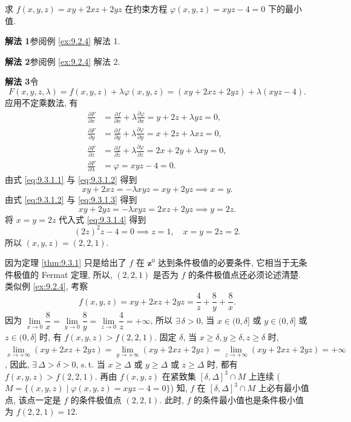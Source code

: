 \begin{example}\label{ex:9.3.1}
求 $f(x, y, z) = xy + 2xz + 2yz$ 在约束方程 $\varphi(x, y, z) = xyz - 4 = 0$ 下的最小值.
\end{example}

\begin{solution}
\textbf{解法 1}\quad 参阅例 \ref{ex:9.2.4} 解法 1.

\textbf{解法 2}\quad 参阅例 \ref{ex:9.2.4} 解法 2.

\textbf{解法 3}\quad 令
\[
  F(x, y, z, \lambda) = f(x, y, z) + \lambda \varphi(x, y, z) = (xy + 2xz + 2yz) + \lambda(xyz - 4).
\]
应用不定乘数法, 有
\begin{align}
  \frac{\partial F}{\partial x} &= \frac{\partial f}{\partial x} + \lambda \frac{\partial \varphi}{\partial x} = y + 2z + \lambda yz = 0, \label{eq:9.3.1.1} \\
  \frac{\partial F}{\partial y} &= \frac{\partial f}{\partial y} + \lambda \frac{\partial \varphi}{\partial y} = x + 2z + \lambda xz = 0, \label{eq:9.3.1.2} \\
  \frac{\partial F}{\partial z} &= \frac{\partial f}{\partial z} + \lambda \frac{\partial \varphi}{\partial z} = 2x + 2y + \lambda xy = 0, \label{eq:9.3.1.3} \\
  \frac{\partial F}{\partial \lambda} &= \varphi = xyz - 4 = 0. \label{eq:9.3.1.4}
\end{align}
由式 \eqref{eq:9.3.1.1} 与 \eqref{eq:9.3.1.2} 得到
\[
  xy + 2xz = -\lambda xyz = xy + 2yz \implies x = y.
\]
由式 \eqref{eq:9.3.1.2} 与 \eqref{eq:9.3.1.3} 得到
\[
  xy + 2yz = -\lambda xyz = 2xz + 2yz \implies y = 2z.
\]
将 $x = y = 2z$ 代入式 \eqref{eq:9.3.1.4} 得到
\[
  (2z)^{2}z - 4 = 0 \implies z = 1, \quad x = y = 2z = 2.
\]
所以 $(x, y, z) = (2, 2, 1)$.

因为定理 \ref{thm:9.3.1} 只是给出了 $f$ 在 $\boldsymbol{z}^{0}$ 达到条件极值的必要条件, 它相当于无条件极值的 Fermat 定理, 所以, $(2, 2, 1)$ 是否为 $f$ 的条件极值点还必须论述清楚. 类似例 \ref{ex:9.2.4}, 考察
\[
  f(x, y, z) = xy + 2xz + 2yz = \frac{4}{z} + \frac{8}{y} + \frac{8}{x}.
\]
因为 $\lim\limits_{x \to 0} \dfrac{8}{x} = \lim\limits_{y \to 0} \dfrac{8}{y} = \lim\limits_{z \to 0} \dfrac{4}{z} = +\infty$, 所以 $\exists\, \delta > 0$, 当 $x \in (0, \delta]$ 或 $y \in (0, \delta]$ 或 $z \in (0, \delta]$ 时, 有 $f(x, y, z) > f(2, 2, 1)$. 固定 $\delta$, 当 $x \geqslant \delta, y \geqslant \delta, z \geqslant \delta$ 时, $\lim\limits_{x \to +\infty}(xy + 2xz + 2yz) = \lim\limits_{y \to +\infty}(xy + 2xz + 2yz) = \lim\limits_{z \to +\infty}(xy + 2xz + 2yz) = +\infty$, 因此, $\exists\, \Delta > \delta > 0$, s.\,t. 当 $x \geqslant \Delta$ 或 $y \geqslant \Delta$ 或 $z \geqslant \Delta$ 时, 都有 $f(x, y, z) > f(2, 2, 1)$. 再由 $f(x, y, z)$ 在紧致集 $[\delta, \Delta]^{3} \cap M$ 上连续 ($M = \{(x, y, z) \mid \varphi(x, y, z) = xyz - 4 = 0\}$) 知, $f$ 在 $[\delta, \Delta]^{3} \cap M$ 上必有最小值点, 该点一定是 $f$ 的条件极值点 $(2, 2, 1)$. 此时, $f$ 的条件最小值也是条件极小值为 $f(2, 2, 1) = 12$.
\end{solution}

